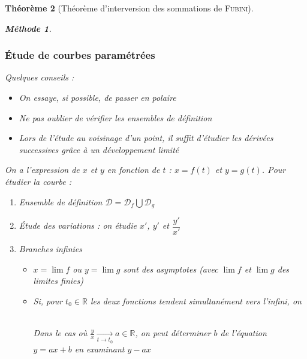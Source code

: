 \documentclass[11pt,a4paper]{report}
\newtheorem{theorem}{Théorème}[chapter]
\theoremstyle{definition}
\newtheorem{methode}[theorem]{Méthode}
\begin{document}
\begin{theorem}[Théorème d'interversion des sommations de \textsc{Fubini}]
{{\begin{methode}
\subsubsection*{Étude de courbes paramétrées}
Quelques conseils :
\begin{itemize}
	\item On essaye, si possible, de \emph{passer en polaire}
	\item Ne pas oublier de vérifier les \emph{ensembles de définition}
	\item Lors de l'étude \emph{au voisinage d'un point}, il suffit d'étudier les dérivées successives grâce à un \emph{développement limité}
\end{itemize}
\end{methode}
On a l'expression de $x$ et $y$ en fonction de $t$ : $x = f(t)$ et $y = g(t)$. Pour étudier la courbe : 
\begin{enumerate}
    \item Ensemble de \emph{définition} $\mathcal{D} = \mathcal{D}_f \bigcup \mathcal{D}_g$
    \item Étude des \emph{variations} : on étudie $x'$, $y'$ et $\dfrac{y'}{x'}$
    \item \emph{Branches infinies} 
    	\begin{itemize}
    		\item $x = \lim f$ ou $y = \lim g$ sont des asymptotes (avec $\lim f$ et $\lim g$ des limites finies)
    		\item Si, pour $t_0 \in \ensuremath{\mathbb{R}}$ les deux fonctions tendent \emph{simultanément} vers l'infini, on 
    		\hfill \\
    		\begin{center}
			\end{center}
    		\hfill \\
    		Dans le cas où $\frac{y}{x} \xrightarrow[t \to t_0]{} a \in \ensuremath{\mathbb{R}}$, on peut déterminer $b$ de l'équation $y = ax + b$ en examinant $y - ax$
    	\end{itemize}
\end{enumerate}

}}
\end{theorem}
\end{document}
